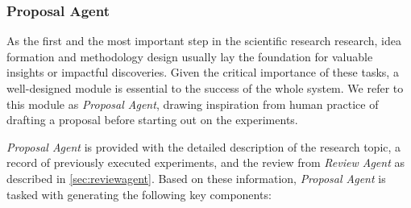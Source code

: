 \documentclass{article} %
\begin{document}
\subsubsection{Proposal Agent}

As the first and the most important step in the scientific research research, idea formation and methodology design usually lay the foundation for valuable insights or impactful discoveries. Given the critical importance of these tasks, a well-designed module is essential to the success of the whole system. We refer to this module as \textit{Proposal Agent}, drawing inspiration from human practice of drafting a proposal before starting out on the experiments.

\textit{Proposal Agent} is provided with the detailed description of the research topic, a record of previously executed experiments, and the review from \textit{Review Agent} as described in \ref{sec:reviewagent}. Based on these information, \textit{Proposal Agent} is tasked with generating the following key components:
\end{document}
